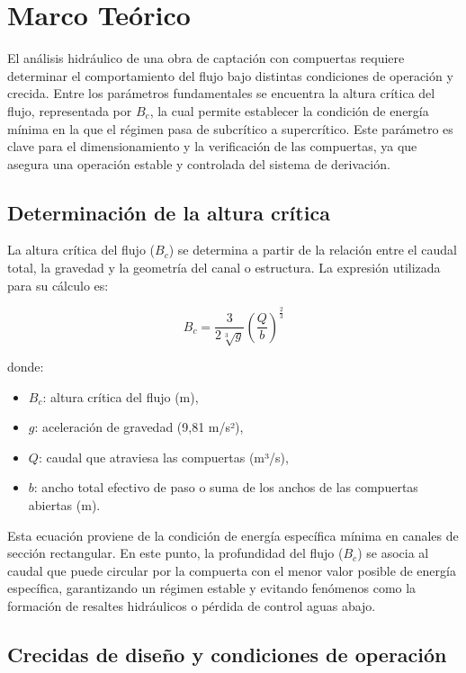 \documentclass{article} %
\begin{document}
\newpage
\section{Marco Teórico}

El análisis hidráulico de una obra de captación con compuertas requiere determinar el comportamiento del flujo bajo distintas condiciones de operación y crecida. Entre los parámetros fundamentales se encuentra la altura crítica del flujo, representada por \( B_c \), la cual permite establecer la condición de energía mínima en la que el régimen pasa de subcrítico a supercrítico. Este parámetro es clave para el dimensionamiento y la verificación de las compuertas, ya que asegura una operación estable y controlada del sistema de derivación.

\subsection{Determinación de la altura crítica}

La altura crítica del flujo (\( B_c \)) se determina a partir de la relación entre el caudal total, la gravedad y la geometría del canal o estructura. La expresión utilizada para su cálculo es:

\[
B_c = \frac{3}{2 \sqrt[3]{g}} \left( \frac{Q}{b} \right)^{\tfrac{2}{3}}
\]

donde:

\begin{itemize}
    \item \( B_c \): altura crítica del flujo (m),
    \item \( g \): aceleración de gravedad (9,81 m/s²),
    \item \( Q \): caudal que atraviesa las compuertas (m³/s),
    \item \( b \): ancho total efectivo de paso o suma de los anchos de las compuertas abiertas (m).
\end{itemize}

Esta ecuación proviene de la condición de energía específica mínima en canales de sección rectangular. En este punto, la profundidad del flujo (\( B_c \)) se asocia al caudal que puede circular por la compuerta con el menor valor posible de energía específica, garantizando un régimen estable y evitando fenómenos como la formación de resaltes hidráulicos o pérdida de control aguas abajo.

\subsection{Crecidas de diseño y condiciones de operación}
\end{document}
